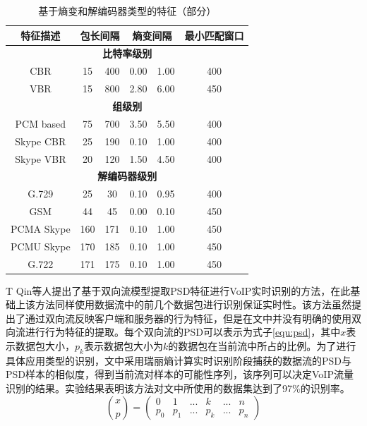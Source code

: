 \begin{table} [thb]
\caption{基于熵变和解编码器类型的特征（部分）}\label{tab:entropycodec}
\small
\centering
\begin{tabular}{cccccc}
  \hline
        \textbf{特征描述} & \multicolumn{2}{c}{\textbf{包长间隔}} & \multicolumn{2}{c}{\textbf{熵变间隔}} &  \textbf{最小匹配窗口} \\
  \hline
  \multicolumn{6}{c}{\scriptsize \textbf{比特率级别}}\\
        CBR & 15 & 400 & 0.00 & 1.00 & 400 \\
        VBR & 15 & 800 & 2.80 & 6.00 & 450 \\
\multicolumn{6}{c}{\scriptsize \textbf{组级别}}\\
PCM based & 75 & 700 & 3.50 & 5.50 & 400 \\
Skype CBR & 25 & 190 & 0.10 & 1.00 & 400 \\
Skype VBR & 20 & 120 & 1.50 & 4.50 & 400 \\
\multicolumn{6}{c}{\scriptsize \textbf{解编码器级别}}\\
G.729 & 25 & 30 & 0.10 & 0.95 & 400 \\
GSM & 44 & 45 & 0.00 & 0.10 & 450 \\
PCMA Skype& 160 & 171 & 0.10 & 1.00 & 450 \\
PCMU Skype& 170 & 185 & 0.10 & 1.00 & 450 \\
G.722& 171 & 175 & 0.10 & 1.00 & 450 \\
 \hline
\end{tabular}
\end{table}

T Qin等人提出了基于双向流模型提取PSD特征进行VoIP实时识别的方法\supercite{22}，在此基础上该方法同样使用数据流中的前几个数据包进行识别保证实时性。该方法虽然提出了通过双向流反映客户端和服务器的行为特征，但是在文中并没有明确的使用双向流进行行为特征的提取。每个双向流的PSD可以表示为式子\ref{equ:psd}，其中$x$表示数据包大小，$p_{k}$表示数据包大小为$k$的数据包在当前流中所占的比例。为了进行具体应用类型的识别，文中采用瑞丽熵计算实时识别阶段捕获的数据流的PSD与PSD样本的相似度，得到当前流对样本的可能性序列，该序列可以决定VoIP流量识别的结果。实验结果表明该方法对文中所使用的数据集达到了97\%的识别率。
\begin{equation}
\label{equ:psd}
\binom{x}{p}=\begin{pmatrix}
0 & 1 & ... &  k&  ...&n \\ 
 p_{0}&  p_{1}&...  & p_{k} &...  & p_{n}
\end{pmatrix}
\end{equation}


